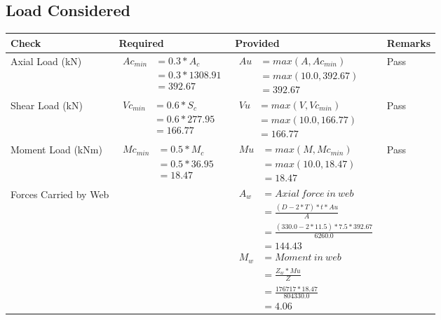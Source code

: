 \documentclass{article}%
\begin{document}
\subsection{Load Considered}%
\label{subsec:LoadConsidered}%
\renewcommand{\arraystretch}{1.2}%
\begin{longtable}{|p{4cm}|p{5cm}|p{5.5cm}|p{1.5cm}|}%
\hline%
\rowcolor{OsdagGreen}%
Check&Required&Provided&Remarks\\%
\hline%
\endhead%
\hline%
Axial Load (kN)&$\begin{aligned} Ac_{min} &= 0.3 * A_c\\ &= 0.3 *1308.91\\ &=392.67\end{aligned}$&$\begin{aligned} Au &= max(A,Ac_{min} )\\ &= max( 10.0,392.67)\\ &=392.67\end{aligned}$&Pass\\%
\hline%
Shear Load (kN)&$\begin{aligned} Vc_{min} &= 0.6 * S_c\\ &= 0.6 *277.95\\ &=166.77\end{aligned}$&$\begin{aligned} Vu &= max(V,Vc_{min})\\ &=  max(10.0,166.77)\\ &=166.77\end{aligned}$&Pass\\%
\hline%
Moment Load (kNm)&$\begin{aligned} Mc_{min} &= 0.5 * M_c\\ &= 0.5 *36.95\\ &=18.47\end{aligned}$&$\begin{aligned} Mu &= max(M,Mc_{min} )\\ &= max(10.0,18.47)\\ &=18.47\end{aligned}$&Pass\\%
\hline%
Forces Carried by Web&&$\begin{aligned}A_w &= Axial~ force~ in~ web  \\   &= \frac{(D- 2*T)*t* Au }{A} \\ &= \frac{(330.0- 2*11.5)*7.5*392.67 }{6260.0} \\ &=144.43\\ M_w &= Moment ~in ~web  \\  &= \frac{Z_w * Mu}{Z} \\ &= \frac{176717 * 18.47}{804330.0} \\ &=4.06\end{aligned}$&\\%

\end{longtable}
\end{document}
